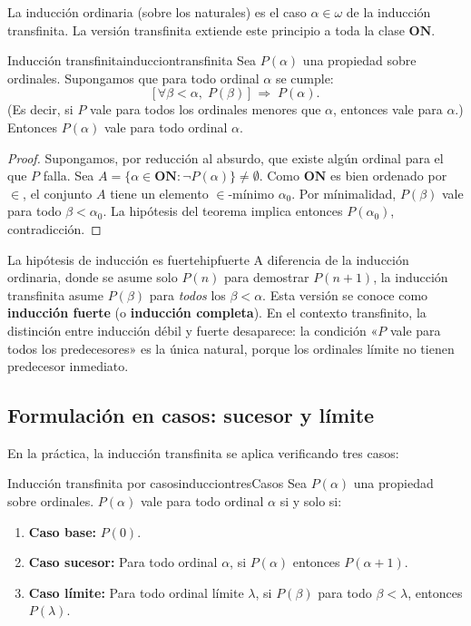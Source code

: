 La inducción ordinaria (sobre los naturales) es el caso $\alpha \in \omega$ de la inducción transfinita. La versión transfinita extiende este principio a toda la clase $\mathbf{ON}$.

\begin{teorema}{Inducción transfinita}{inducciontransfinita}
Sea $P(\alpha)$ una propiedad sobre ordinales. Supongamos que para todo ordinal $\alpha$ se cumple:
\[
  \bigl[\,\forall \beta < \alpha,\; P(\beta)\,\bigr] \;\Longrightarrow\; P(\alpha).
\]
(Es decir, si $P$ vale para todos los ordinales menores que $\alpha$, entonces vale para $\alpha$.) Entonces $P(\alpha)$ vale para todo ordinal $\alpha$.
\end{teorema}

\begin{proof}
Supongamos, por reducción al absurdo, que existe algún ordinal para el que $P$ falla. Sea $A = \{\alpha \in \mathbf{ON} : \neg P(\alpha)\} \neq \emptyset$. Como $\mathbf{ON}$ es bien ordenado por $\in$, el conjunto $A$ tiene un elemento $\in$-mínimo $\alpha_0$. Por mínimalidad, $P(\beta)$ vale para todo $\beta < \alpha_0$. La hipótesis del teorema implica entonces $P(\alpha_0)$, contradicción.
\end{proof}

\begin{observacion}{La hipótesis de inducción es fuerte}{hipfuerte}
A diferencia de la inducción ordinaria, donde se asume solo $P(n)$ para demostrar $P(n+1)$, la inducción transfinita asume $P(\beta)$ para \emph{todos} los $\beta < \alpha$. Esta versión se conoce como \textbf{inducción fuerte} (o \textbf{inducción completa}). En el contexto transfinito, la distinción entre inducción débil y fuerte desaparece: la condición «$P$ vale para todos los predecesores» es la única natural, porque los ordinales límite no tienen predecesor inmediato.
\end{observacion}

\subsection{Formulación en casos: sucesor y límite}

En la práctica, la inducción transfinita se aplica verificando tres casos:

\begin{importante}
\begin{teorema}{Inducción transfinita por casos}{inducciontresCasos}
Sea $P(\alpha)$ una propiedad sobre ordinales. $P(\alpha)$ vale para todo ordinal $\alpha$ si y solo si:
\begin{enumerate}[leftmargin=2em, label=(\Roman*)]
  \item \textbf{Caso base:} $P(0)$.
  \item \textbf{Caso sucesor:} Para todo ordinal $\alpha$, si $P(\alpha)$ entonces $P(\alpha+1)$.
  \item \textbf{Caso límite:} Para todo ordinal límite $\lambda$, si $P(\beta)$ para todo $\beta < \lambda$, entonces $P(\lambda)$.
\end{enumerate}
\end{teorema}
\end{importante}

